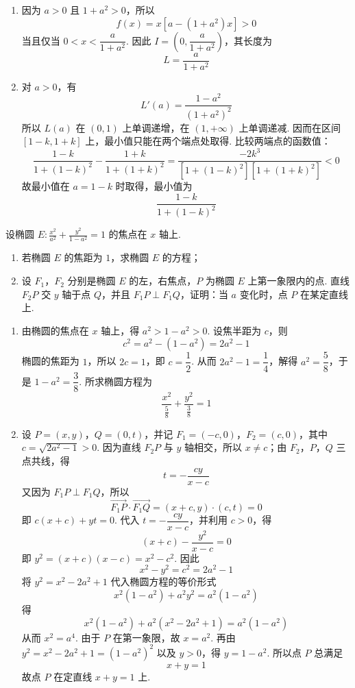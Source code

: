 \begin{solution}
\begin{enumerate}
\item 因为 \(a>0\) 且 \(1+a^2>0\)，所以
\[
f(x)=x\left[a-(1+a^2)x\right]>0
\]
当且仅当 \(0<x<\dfrac{a}{1+a^2}\). 因此 \(I=\left(0,\dfrac{a}{1+a^2}\right)\)，其长度为
\[
L=\frac{a}{1+a^2}
\]

\item 对 \(a>0\)，有
\[
L'(a)=\frac{1-a^2}{(1+a^2)^2}
\]
所以 \(L(a)\) 在 \((0,1)\) 上单调递增，在 \((1,+\infty)\) 上单调递减. 因而在区间 \([1-k,1+k]\) 上，最小值只能在两个端点处取得. 比较两端点的函数值：
\[
\frac{1-k}{1+(1-k)^2}-\frac{1+k}{1+(1+k)^2}
=\frac{-2k^3}{\left[1+(1-k)^2\right]\left[1+(1+k)^2\right]}<0
\]
故最小值在 \(a=1-k\) 时取得，最小值为
\[
\frac{1-k}{1+(1-k)^2}
\]
\end{enumerate}
\end{solution}

\begin{problem}
设椭圆 \(E: \frac{x^2}{a^2} + \frac{y^2}{1-a^2} = 1\) 的焦点在 \(x\) 轴上.
\begin{enumerate}
\item 若椭圆 \(E\) 的焦距为 \(1\)，求椭圆 \(E\) 的方程；
\item 设 \(F_{1}\)，\(F_{2}\) 分别是椭圆 \(E\) 的左，右焦点，\(P\) 为椭圆 \(E\) 上第一象限内的点. 直线 \(F_{2}P\) 交 \(y\) 轴于点 \(Q\)，并且 \(F_{1}P \perp F_{1}Q\)，证明：当 \(a\) 变化时，点 \(P\) 在某定直线上.
\end{enumerate}
\end{problem}

\begin{solution}
\begin{enumerate}
\item 由椭圆的焦点在 \(x\) 轴上，得 \(a^2>1-a^2>0\). 设焦半距为 \(c\)，则
\[
c^2=a^2-(1-a^2)=2a^2-1
\]
椭圆的焦距为 \(1\)，所以 \(2c=1\)，即 \(c=\dfrac{1}{2}\). 从而 \(2a^2-1=\dfrac{1}{4}\)，解得 \(a^2=\dfrac{5}{8}\)，于是 \(1-a^2=\dfrac{3}{8}\). 所求椭圆方程为
\[
\frac{x^2}{\frac{5}{8}}+\frac{y^2}{\frac{3}{8}}=1
\]

\item 设 \(P=(x,y)\)，\(Q=(0,t)\)，并记 \(F_1=(-c,0)\)，\(F_2=(c,0)\)，其中 \(c=\sqrt{2a^2-1}>0\). 因为直线 \(F_2P\) 与 \(y\) 轴相交，所以 \(x\ne c\)；由 \(F_2\)，\(P\)，\(Q\) 三点共线，得
\[
t=-\frac{cy}{x-c}
\]
又因为 \(F_1P\perp F_1Q\)，所以
\[
\overrightarrow{F_1P}\cdot\overrightarrow{F_1Q}=(x+c,y)\cdot(c,t)=0
\]
即 \(c(x+c)+yt=0\). 代入 \(t=-\dfrac{cy}{x-c}\)，并利用 \(c>0\)，得
\[
(x+c)-\frac{y^2}{x-c}=0
\]
即 \(y^2=(x+c)(x-c)=x^2-c^2\). 因此
\[
x^2-y^2=c^2=2a^2-1
\]
将 \(y^2=x^2-2a^2+1\) 代入椭圆方程的等价形式
\[
x^2(1-a^2)+a^2y^2=a^2(1-a^2)
\]
得
\[
x^2(1-a^2)+a^2(x^2-2a^2+1)=a^2(1-a^2)
\]
从而 \(x^2=a^4\). 由于 \(P\) 在第一象限，故 \(x=a^2\). 再由 \(y^2=x^2-2a^2+1=(1-a^2)^2\) 以及 \(y>0\)，得 \(y=1-a^2\). 所以点 \(P\) 总满足
\[
x+y=1
\]
故点 \(P\) 在定直线 \(x+y=1\) 上.
\end{enumerate}
\end{solution}


